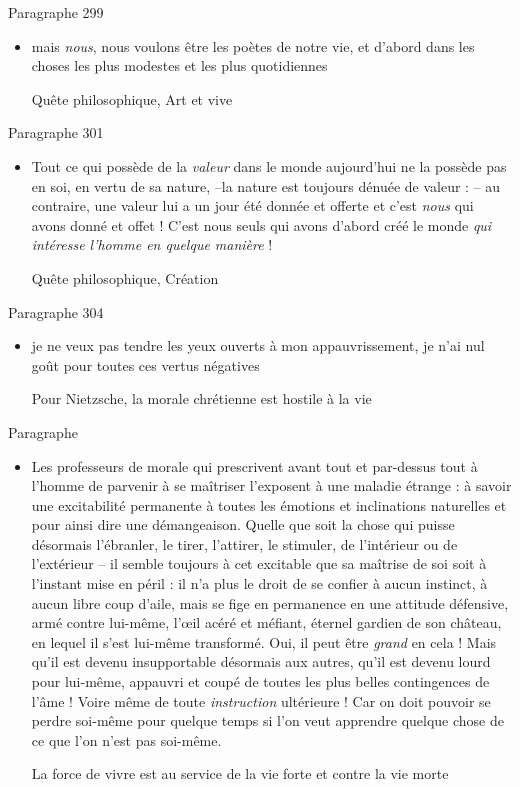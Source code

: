 \documentclass[french,a4paper,11pt,answers]{exam}
\newcommand{\cit}[2]{\og #1 \fg{} \begin{solution}{ #2 }\end{solution}} %
\begin{document}
	\begin{cadre}{Paragraphe 299}
		\begin{itemize}
			\item \cit{mais \emph{nous}, nous voulons être les poètes de notre vie, et d'abord dans les choses les plus modestes et les plus quotidiennes}
				{Quête philosophique, Art et vive}
		\end{itemize}
	\end{cadre}
	\begin{cadre}{Paragraphe 301}
		\begin{itemize}
			\item \cit{Tout ce qui possède de la \emph{valeur} dans le monde aujourd'hui ne la possède pas en soi, en vertu de sa nature, --la nature est toujours dénuée de valeur : -- au contraire, une valeur lui a un jour été donnée et offerte et c'est \emph{nous} qui avons donné et offet ! C'est nous seuls qui avons d'abord créé le monde \emph{qui intéresse l'homme en quelque manière} !}
				{Quête philosophique, Création}
		\end{itemize}
	\end{cadre}
	
	\begin{cadre}{Paragraphe 304}
		\begin{itemize}
			\item \cit{je ne veux pas tendre les yeux ouverts à mon appauvrissement, je n'ai nul goût pour toutes ces vertus négatives}
				{Pour Nietzsche, la morale chrétienne est hostile à la vie}
		\end{itemize}
	\end{cadre}
	
	\begin{cadre}{Paragraphe }
		\begin{itemize}
			\item \cit{Les professeurs de morale qui prescrivent avant tout et par-dessus tout à l’homme de parvenir à se maîtriser l’exposent à une maladie étrange : à savoir une excitabilité permanente à toutes les émotions et inclinations naturelles et pour ainsi dire une démangeaison. Quelle que soit la chose qui puisse désormais l’ébranler, le tirer, l’attirer, le stimuler, de l’intérieur ou de l’extérieur – il semble toujours à cet excitable que sa maîtrise de soi soit à l’instant mise en péril : il n’a plus le droit de se confier à aucun instinct, à aucun libre coup d’aile, mais se fige en permanence en une attitude défensive, armé contre lui-même, l’œil acéré et méfiant, éternel gardien de son château, en lequel il s’est lui-même transformé. Oui, il peut être \emph{grand} en cela ! Mais qu’il est devenu insupportable désormais aux autres, qu’il est devenu lourd pour lui-même, appauvri et coupé de toutes les plus belles contingences de l’âme ! Voire même de toute \emph{instruction} ultérieure ! Car on doit pouvoir se perdre soi-même pour quelque temps si l’on veut apprendre quelque chose de ce que l’on n’est pas soi-même.}
				{La force de vivre est au service de la vie forte et contre la vie morte} %
		\end{itemize}
	\end{cadre}
	
\end{document}

